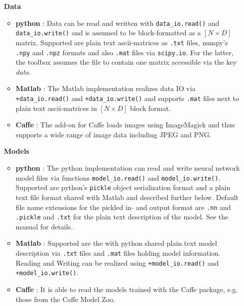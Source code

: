 \documentclass[a4wide]{article}
\begin{document}
\begin{itemize}
\item[{\textbf{Data}}]
	\begin{itemize}
		\item \textbf{python} : Data can be read and written with \texttt{data\_io.read()} and \texttt{data\_io.write()} and is assumed to be block-formatted as a $[N \times D]$ matrix. Supported are plain text ascii-matrices as \texttt{.txt} files, numpy's \texttt{.npy} and \texttt{.npz} formats and also \texttt{.mat} files via \texttt{scipy.io}. For the latter, the toolbox assumes the file to contain one matrix accessible via the key \emph{data}.
		\item \textbf{Matlab} : The Matlab implementation realizes data IO via \texttt{+data\_io.read()} and \texttt{+data\_io.write()} and supports \texttt{.mat} files next to plain text ascii-matrices in $[N \times D]$ block format.
		\item \textbf{Caffe} : The add-on for Caffe loads images using ImageMagick and thus supports a wide range of image data including JPEG and PNG.
	\end{itemize}
\item[{\textbf{Models}}]
	\begin{itemize}
		\item \textbf{python} : The python implementation can read and write neural network model files via functions \texttt{model\_io.read()} and \texttt{model\_io.write()}. Supported are python's \texttt{pickle} object serialization format and a plain text file format shared with Matlab and described further below. Default file name extensions for the pickled in- and output format are \texttt{.nn} and \texttt{.pickle} and \texttt{.txt} for the plain text description of the model. See the manual for details.
		\item \textbf{Matlab} : Supported are the with python shared plain text model description via \texttt{.txt} files and \texttt{.mat} files holding model information. Reading and Writing can be realized using \texttt{+model\_io.read()} and \texttt{+model\_io.write()}.

		\item \textbf{Caffe} : It is able to read the models trained with the Caffe package, e.g. those from the Caffe Model Zoo.
		\end{itemize}


\end{itemize}
\end{document}
